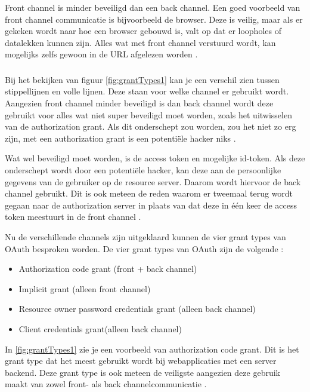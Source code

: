 \subsubsection{}
Front channel is minder beveiligd dan een back channel. Een goed voorbeeld van front channel communicatie is bijvoorbeeld de browser. Deze is veilig, maar als er gekeken wordt naar hoe een browser gebouwd is, valt op dat er loopholes of datalekken kunnen zijn. Alles wat met front channel verstuurd wordt, kan mogelijks zelfs gewoon in de URL afgelezen worden \autocite{OktaDev2018}.
\subsubsection{}
Bij het bekijken van figuur \ref{fig:grantTypes1} kan je een verschil zien tussen stippellijnen en volle lijnen. Deze staan voor welke channel er gebruikt wordt. Aangezien front channel minder beveiligd is dan back channel wordt deze gebruikt voor alles wat niet super beveiligd moet worden, zoals het uitwisselen van de authorization grant. Als dit onderschept zou worden, zou het niet zo erg zijn, met een authorization grant is een potentiële hacker niks \autocite{OktaDev2018}. 

Wat wel beveiligd moet worden, is de access token en mogelijke id-token. Als deze onderschept wordt door een potentiële hacker, kan deze aan de persoonlijke gegevens van de gebruiker op de resource server. Daarom wordt hiervoor de back channel gebruikt. Dit is ook meteen de reden waarom er tweemaal terug wordt gegaan naar de authorization server in plaats van dat deze in één keer de access token meestuurt in de front channel \autocite{OktaDev2018}.

Nu de verschillende channels zijn uitgeklaard kunnen de vier grant types van OAuth besproken worden. De vier grant types van OAuth zijn de volgende \autocite{OktaDev2018}:
\begin{itemize}
	\item Authorization code grant (front + back channel)
	\item Implicit grant (alleen front channel)
	\item Resource owner password credentials grant (alleen back channel)
	\item Client credentials grant(alleen back channel)
\end{itemize}
In \ref{fig:grantTypes1} zie je een voorbeeld van authorization code grant. Dit is het grant type dat het meest gebruikt wordt bij webapplicaties met een server backend. Deze grant type is ook meteen de veiligste aangezien deze gebruik maakt van zowel front- als back channelcommunicatie \autocite{OktaDev2018}.

